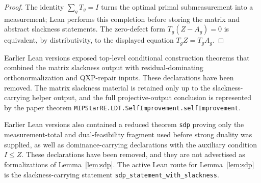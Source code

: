 \begin{proof}
  \leanok
  The identity \(\sum_gT_g=I\) turns the optimal primal submeasurement into a
  measurement; Lean performs this completion before storing the matrix and
  abstract slackness statements.  The zero-defect form \(T_g(Z-A_g)=0\) is
  equivalent, by distributivity, to the displayed equation \(T_gZ=T_gA_g\).
\end{proof}

\begin{remark}\label{rem:sdp-matrix-residual-domination-assembly}
  Earlier Lean versions exposed top-level conditional construction theorems that
  combined the matrix slackness output with residual-dominating
  orthonormalization and QXP-repair inputs.  These declarations have been
  removed.  The matrix slackness material is retained only up to the
  slackness-carrying helper output, and the full projective-output conclusion is
  represented by the paper theorem
  \texttt{MIPStarRE.LDT.SelfImprovement.selfImprovement}.
\end{remark}

\begin{remark}\label{rem:lean-reduced-sdp-dominance-interfaces}
  Earlier Lean versions also contained a reduced theorem \texttt{sdp} proving
  only the measurement-total and dual-feasibility fragment used before strong
  duality was supplied, as well as dominance-carrying declarations with the
  auxiliary condition \(I\le Z\).  These declarations have been removed, and
  they are not advertised as formalizations of Lemma~\ref{lem:sdp}.  The active
  Lean route for Lemma~\ref{lem:sdp} is the slackness-carrying statement
  \texttt{sdp\_statement\_with\_slackness}.
\end{remark}

